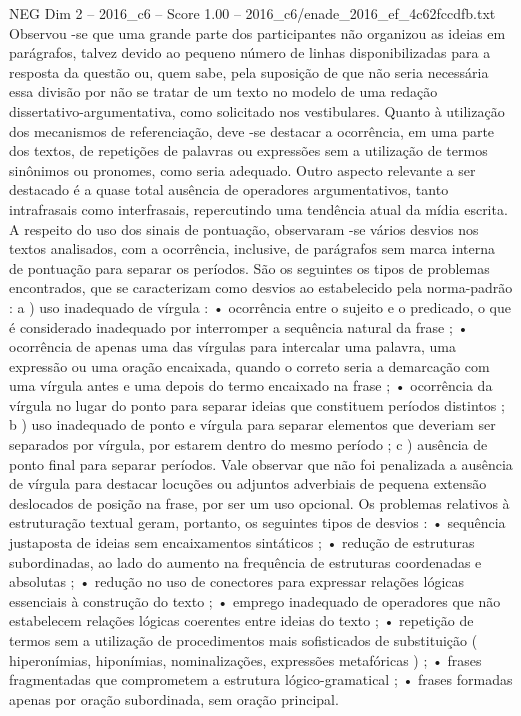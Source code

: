 \begin{textsample}{NEG Dim 2 – 2016\_c6 – Score 1.00 – 2016\_c6/enade\_2016\_ef\_4c62fccdfb.txt}
Observou -se que uma grande parte dos participantes não organizou as ideias em parágrafos, talvez devido ao pequeno número de linhas disponibilizadas para a resposta da questão ou, quem sabe, pela suposição de que não seria necessária essa divisão por não se tratar de um texto no modelo de uma redação dissertativo-argumentativa, como solicitado nos vestibulares.
Quanto à utilização dos mecanismos de referenciação, deve -se destacar a ocorrência, em uma parte dos textos, de repetições de palavras ou expressões sem a utilização de termos sinônimos ou pronomes, como seria adequado.
Outro aspecto relevante a ser destacado é a quase total ausência de operadores argumentativos, tanto intrafrasais como interfrasais, repercutindo uma tendência atual da mídia escrita.
A respeito do uso dos sinais de pontuação, observaram -se vários desvios nos textos analisados, com a ocorrência, inclusive, de parágrafos sem marca interna de pontuação para separar os períodos.
São os seguintes os tipos de problemas encontrados, que se caracterizam como desvios ao estabelecido pela norma-padrão : a ) uso inadequado de vírgula : • ocorrência entre o sujeito e o predicado, o que é considerado inadequado por interromper a sequência natural da frase ; • ocorrência de apenas uma das vírgulas para intercalar uma palavra, uma expressão ou uma oração encaixada, quando o correto seria a demarcação com uma vírgula antes e uma depois do termo encaixado na frase ; • ocorrência da vírgula no lugar do ponto para separar ideias que constituem períodos distintos ; b ) uso inadequado de ponto e vírgula para separar elementos que deveriam ser separados por vírgula, por estarem dentro do mesmo período ; c ) ausência de ponto final para separar períodos.
Vale observar que não foi penalizada a ausência de vírgula para destacar locuções ou adjuntos adverbiais de pequena extensão deslocados de posição na frase, por ser um uso opcional.
Os problemas relativos à estruturação textual geram, portanto, os seguintes tipos de desvios : • sequência justaposta de ideias sem encaixamentos sintáticos ; • redução de estruturas subordinadas, ao lado do aumento na frequência de estruturas coordenadas e absolutas ; • redução no uso de conectores para expressar relações lógicas essenciais à construção do texto ; • emprego inadequado de operadores que não estabelecem relações lógicas coerentes entre ideias do texto ; • repetição de termos sem a utilização de procedimentos mais sofisticados de substituição ( hiperonímias, hiponímias, nominalizações, expressões metafóricas ) ; • frases fragmentadas que comprometem a estrutura lógico-gramatical ; • frases formadas apenas por oração subordinada, sem oração principal.

\end{textsample}
